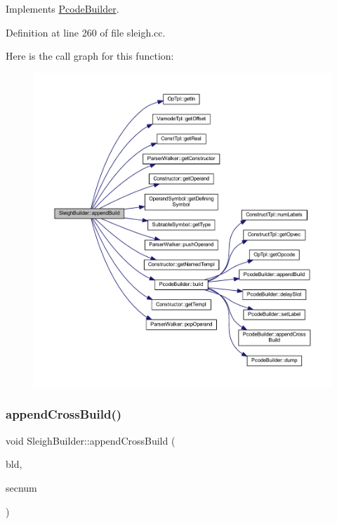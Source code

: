 Implements \mbox{\hyperlink{class_pcode_builder_aa5c50ed5c414075e71fee8d31a976608}{Pcode\+Builder}}.



Definition at line 260 of file sleigh.\+cc.

Here is the call graph for this function\+:
\nopagebreak
\begin{figure}[H]
\begin{center}
\leavevmode
\includegraphics[width=350pt]{class_sleigh_builder_a9e9d6b0de400f9aa14caf2732b7bfeef_cgraph}
\end{center}
\end{figure}
\mbox{\label{class_sleigh_builder_a343885f1c2044a04ae3587d121a968dd}} 
\subsubsection{\texorpdfstring{appendCrossBuild()}{appendCrossBuild()}}
{\footnotesize\ttfamily void Sleigh\+Builder\+::append\+Cross\+Build (\begin{DoxyParamCaption}\item[{\mbox{\hyperlink{class_op_tpl}{Op\+Tpl}} $\ast$}]{bld,  }\item[{int4}]{secnum }\end{DoxyParamCaption})\hspace{0.3cm}{\ttfamily [virtual]}}



